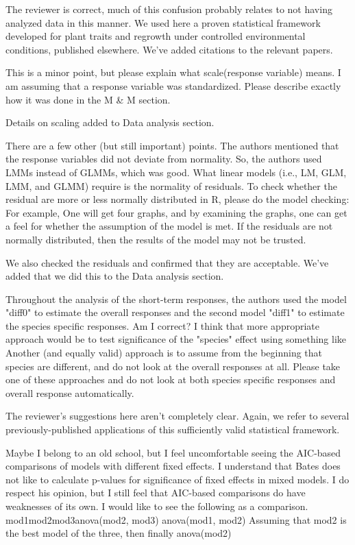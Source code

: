 \documentclass[parskip=half]{scrartcl}
\newcommand{\AR}[1]
	{\color{PineGreen}#1\color{black} \par }
\begin{document}
\AR{The reviewer is correct, much of this confusion probably relates to not having analyzed data in this manner. We used here a proven statistical framework developed for plant traits and regrowth under controlled environmental conditions, published elsewhere. We've added citations to the relevant papers.}

This is a minor point, but please explain what scale(response variable) means. I am assuming that a response variable was standardized. Please describe exactly how it was done in the M \& M section.

\AR{Details on scaling added to Data analysis section.}

There are a few other (but still important) points.
The authors mentioned that the response variables did not deviate from normality. So, the authors used LMMs instead of GLMMs, which was good.
What linear models (i.e., LM, GLM, LMM, and GLMM) require is the normality of residuals.
To check whether the residual are more or less normally distributed in R, please do the model checking: For example, One will get four graphs, and by examining the graphs, one can get a feel for whether the assumption of the model is met. If the residuals are not normally distributed, then the results of the model may not be trusted.

\AR{We also checked the residuals and confirmed that they are acceptable. We've added that we did this to the Data analysis section.} 

Throughout the analysis of the short-term responses, the authors used the model "diff0" to estimate the overall responses and the second model "diff1" to estimate the species specific responses. Am I correct?
I think that more appropriate approach would be to test significance of the "species" effect using something like Another (and equally valid) approach is to assume from the beginning that species are different, and do not look at the overall responses at all. Please take one of these approaches and do not look at both species specific responses and overall response automatically.

\AR{The reviewer's suggestions here aren't completely clear. Again, we refer to several previously-published applications of this sufficiently valid statistical framework.} 

Maybe I belong to an old school, but I feel uncomfortable seeing the AIC-based comparisons of models with different fixed effects. I understand that Bates does not like to calculate p-values for significance of fixed effects in mixed models. I do respect his opinion, but I still feel that AIC-based comparisons do have weaknesses of its own. I would like to see the following as a comparison.
mod1mod2mod3anova(mod2, mod3)
anova(mod1, mod2)
Assuming that mod2 is the best model of the three, then finally
anova(mod2)
\end{document}
